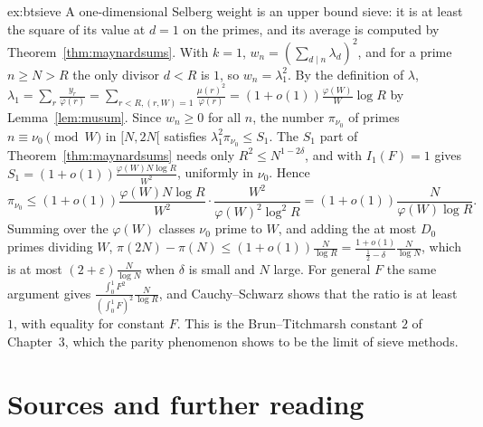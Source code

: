 \begin{solution}{ex:btsieve}
\idea A one-dimensional Selberg weight is an upper bound sieve: it is at least the square of its value at $d=1$ on the primes, and its average is computed by Theorem~\ref{thm:maynardsums}.
\writeup With $k=1$, $w_n=(\sum_{d\mid n}\lambda_d)^2$, and for a prime $n\ge N>R$ the only divisor $d<R$ is $1$, so $w_n=\lambda_1^2$. By the definition of $\lambda$, $\lambda_1=\sum_r\frac{y_r}{\varphi(r)}=\sum_{r<R,(r,W)=1}\frac{\mu(r)^2}{\varphi(r)}=(1+o(1))\frac{\varphi(W)}W\log R$ by Lemma~\ref{lem:musum}. Since $w_n\ge0$ for all $n$, the number $\pi_{\nu_0}$ of primes $n\equiv\nu_0\pmod W$ in $[N,2N[$ satisfies $\lambda_1^2\pi_{\nu_0}\le S_1$. The $S_1$ part of Theorem~\ref{thm:maynardsums} needs only $R^2\le N^{1-2\delta}$, and with $I_1(F)=1$ gives $S_1=(1+o(1))\frac{\varphi(W)N\log R}{W^2}$, uniformly in $\nu_0$. Hence
\[
\pi_{\nu_0}\le(1+o(1))\frac{\varphi(W)N\log R}{W^2}\cdot\frac{W^2}{\varphi(W)^2\log^2R}=(1+o(1))\frac N{\varphi(W)\log R}.
\]
Summing over the $\varphi(W)$ classes $\nu_0$ prime to $W$, and adding the at most $D_0$ primes dividing $W$, $\pi(2N)-\pi(N)\le(1+o(1))\frac N{\log R}=\frac{1+o(1)}{\frac12-\delta}\frac N{\log N}$, which is at most $(2+\varepsilon)\frac N{\log N}$ when $\delta$ is small and $N$ large. For general $F$ the same argument gives $\frac{\int_0^1F^2}{(\int_0^1F)^2}\frac N{\log R}$, and Cauchy--Schwarz shows that the ratio is at least $1$, with equality for constant $F$. This is the Brun--Titchmarsh constant $2$ of Chapter~3, which the parity phenomenon shows to be the limit of sieve methods.
\end{solution}

\section*{Sources and further reading}

